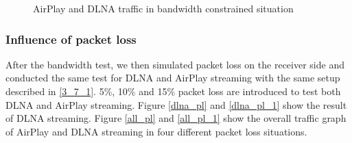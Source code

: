 \begin{figure}[hb]%
\caption{AirPlay and DLNA traffic in
bandwidth constrained situation\label{all_traffic_bw_1}}
\end{figure}
\clearpage
\subsubsection{Influence of packet loss\label{4_1_3}}
After the bandwidth test, we then simulated packet loss on the receiver side and
conducted the same test for DLNA and AirPlay streaming with the same setup
described in \ref{3_7_1}. 5\%, 10\% and 15\% packet loss are introduced to test
both DLNA and AirPlay streaming. Figure \ref{dlna_pl} and \ref{dlna_pl_1} show
the result of DLNA streaming. Figure \ref{all_pl} and \ref{all_pl_1} show the
overall traffic graph of AirPlay and DLNA streaming in four different packet
loss situations.

